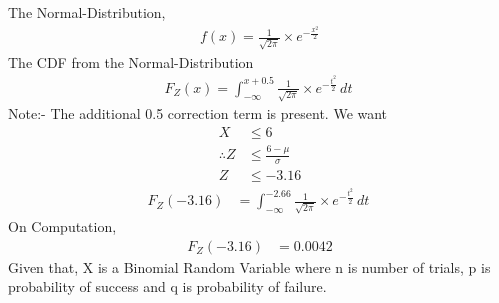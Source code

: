 \documentclass[journal,12pt,twocolumn]{IEEEtran}
\begin{document}
The Normal-Distribution,
\begin{align}
    f(x) = \frac{1}{\sqrt{2\pi}}\times e^{-\frac{x^2}{2}}
\end{align}
The CDF from the Normal-Distribution
\begin{align}
    F_Z(x)=\int_{-\infty}^{x+0.5} \frac{1}{\sqrt{2\pi}}\times e^{-\frac{t^2}{2}} \,dt\
\end{align}
Note:- The additional 0.5 correction term is present.
We want
\begin{align}
    X &\le 6\\
    \therefore Z &\le \frac{6-\mu}{\sigma}\\
    Z&\le-3.16
\end{align}
\begin{align}
F_Z(-3.16) &= \int_{-\infty}^{-2.66} \frac{1}{\sqrt{2\pi}}\times e^{-\frac{t^2}{2}} \,dt\
\end{align}
On Computation,
\begin{align}
F_Z(-3.16) &= 0.0042
\end{align}
\newpage
Given that, X is a Binomial Random Variable where n is number of trials, p is probability of success and q is probability of failure.
\end{document}
